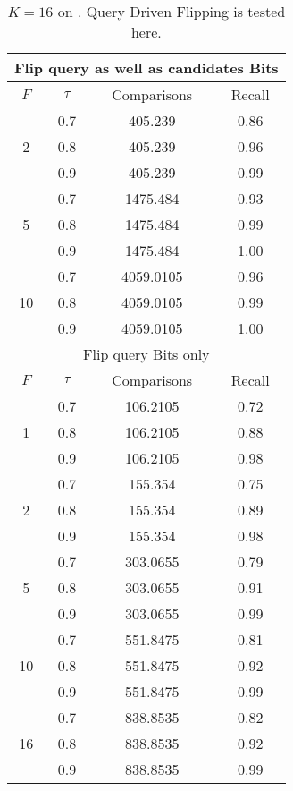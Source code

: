 \documentclass[11pt]{article}
\begin{document}
\begin{table}
\centering
\begin{tabular}{|c|c|c|c|}
\hline
\multicolumn{4}{c}{Flip query as well as candidates Bits} \\
\hline
$F$ & $\tau$ & Comparisons & Recall \\
\hline
\multirow{3}{*}{2} & 0.7 & 405.239 & 0.86 \\
 & 0.8 & 405.239 & 0.96 \\
 & 0.9 & 405.239 & 0.99 \\
\hline
\multirow{3}{*}{5} & 0.7 & 1475.484 & 0.93 \\
 & 0.8 & 1475.484 & 0.99 \\
 & 0.9 & 1475.484 & 1.00 \\
\hline
\multirow{3}{*}{10} & 0.7 & 4059.0105 & 0.96 \\
 & 0.8 & 4059.0105 & 0.99 \\
 & 0.9 & 4059.0105 & 1.00 \\
\hline
\multicolumn{4}{c}{Flip query Bits only} \\
\hline
$F$ & $\tau$ & Comparisons & Recall \\
\hline
\multirow{3}{*}{1} & 0.7 & 106.2105 & 0.72 \\
 & 0.8 & 106.2105 & 0.88 \\
 & 0.9 & 106.2105 & 0.98 \\
\hline
\multirow{3}{*}{2} & 0.7 & 155.354 & 0.75 \\
 & 0.8 & 155.354 & 0.89 \\
 & 0.9 & 155.354 & 0.98 \\
\hline
 \multirow{3}{*}{5} & 0.7 & 303.0655 & 0.79 \\
 & 0.8 & 303.0655 & 0.91 \\
 & 0.9 & 303.0655 & 0.99 \\
\hline
 \multirow{3}{*}{10} & 0.7 & 551.8475 & 0.81 \\
 & 0.8 & 551.8475 & 0.92 \\
 & 0.9 & 551.8475 & 0.99 \\
\hline
 \multirow{3}{*}{16} & 0.7 & 838.8535 & 0.82 \\
 & 0.8 & 838.8535 & 0.92 \\
 & 0.9 & 838.8535 & 0.99 \\
\hline
\end{tabular}
\caption{\footnotesize{$K=16$ on \aol. Query Driven Flipping is tested here.}}
\label{tab:data-so}
\end{table}

\end{document}
